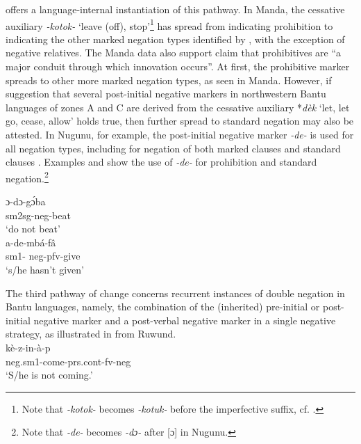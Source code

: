 \documentclass[output=paper,draft,draftmode,colorlinks,citecolor=brown]{langscibook}
\begin{document}
\citet{Bernander2017,Bernander2018} offers a language-internal
instantiation of this pathway. In Manda, the cessative auxiliary
\textit{-kotok-} `leave (off), stop’\footnote{Note that \textit{-kotok-}
becomes \textit{-kotuk-} before the imperfective suffix, cf.
.} has spread from indicating prohibition to indicating
the other marked negation types identified by
\citet{Guldemann1996,Guldemann1999}, with the exception of negative
relatives. The Manda data also support
 claim that prohibitives are ``a major conduit
through which innovation occurs''. At first, the prohibitive marker spreads
to other more marked negation types, as seen in Manda. However, if
 suggestion that several post-initial
negative markers in northwestern Bantu languages of zones A and C are
derived from the cessative auxiliary *\textit{d{\`e}k} `let, let go, cease,
allow' \citep{BastinCoupez2002} holds true, then further spread to standard
negation may also be attested. In Nugunu, for example, the
post-initial negative marker \textit{-de-} is used for all negation types,
including for negation of both marked clauses and standard clauses
\citep{Nurse2007}. Examples  and 
show the use of \textit{-de-} for prohibition and standard
negation.\footnote{Note that \textit{-de-} becomes \textit{-dɔ-} after [ɔ]
in Nugunu.}

\ea\label{ex:nugunu-beat-give}
 \ea\label{ex:nugunu-beat}
\gll ɔ-dɔ-g{\'ɔ}ba\\ {\sc sm2sg}-{\sc neg}-beat\\ 
\glt `do not beat'\\
\ex\label{ex:nugunu-give}
\gll a-de-mbá-f{\^a}\\ {\sc sm}1-{\sc
neg-pfv}-give\\ 
\glt `s/he hasn't given'
\z
\z


%
The third pathway of change
concerns recurrent instances of double negation in Bantu languages, namely,
the combination of the (inherited) pre-initial or post-initial negative
marker and a post-verbal negative marker in a single negative strategy, as
illustrated in  from Ruwund.
\ea\label{ex:ruwund:l53}
\\
\gll
k{\`e}-z-in-{\`a}-p\\ {\sc neg.sm}1-come-{\sc prs.cont-fv-neg}\\
\glt `S/he
is not coming.'
\z
\end{document}
